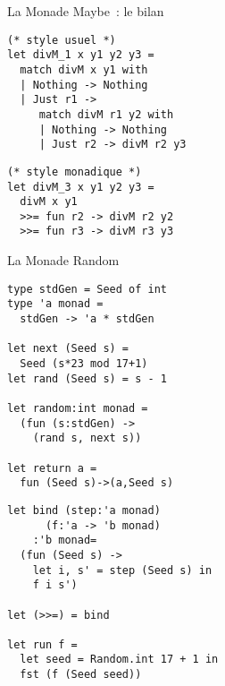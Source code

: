 \documentclass[10pt]{beamer}
\begin{document}
\begin{frame}[fragile]{La Monade Maybe~: le bilan}
  \begin{multicols*}{2}
\begin{verbatim}
(* style usuel *)
let divM_1 x y1 y2 y3 =
  match divM x y1 with
  | Nothing -> Nothing
  | Just r1 ->
     match divM r1 y2 with
     | Nothing -> Nothing
     | Just r2 -> divM r2 y3
\end{verbatim}
    \columnbreak{}
\begin{verbatim}
(* style monadique *)
let divM_3 x y1 y2 y3 =
  divM x y1
  >>= fun r2 -> divM r2 y2
  >>= fun r3 -> divM r3 y3
\end{verbatim}
  \end{multicols*}
\end{frame}

\begin{frame}[fragile]{La Monade Random}
  \begin{multicols*}{2}
\begin{verbatim}
type stdGen = Seed of int
type 'a monad =
  stdGen -> 'a * stdGen

let next (Seed s) =
  Seed (s*23 mod 17+1)
let rand (Seed s) = s - 1

let random:int monad =
  (fun (s:stdGen) ->
    (rand s, next s))

let return a =
  fun (Seed s)->(a,Seed s)
\end{verbatim}
    \columnbreak{}
\begin{verbatim}
let bind (step:'a monad)
      (f:'a -> 'b monad)
    :'b monad=
  (fun (Seed s) ->
    let i, s' = step (Seed s) in
    f i s')

let (>>=) = bind

let run f =
  let seed = Random.int 17 + 1 in
  fst (f (Seed seed))
\end{verbatim}
  \end{multicols*}
\end{frame}
\end{document}
